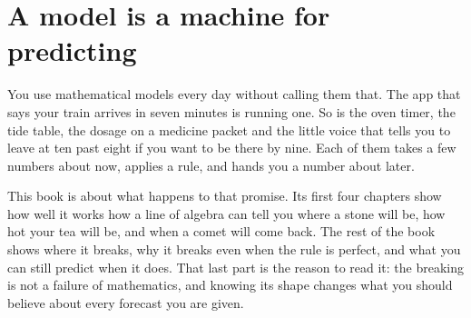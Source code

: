 
\chapter{A model is a machine for predicting}
\label{ch:models}

\noindent
You use mathematical models every day without calling them that. The app
that says your train arrives in seven minutes is running one. So is the
oven timer, the tide table, the dosage on a medicine packet and the little
voice that tells you to leave at ten past eight if you want to be there by
nine. Each of them takes a few numbers about now, applies a rule, and hands
you a number about later.

This book is about what happens to that promise. Its first four chapters
show how well it works \dash{} how a line of algebra can tell you where a
stone will be, how hot your tea will be, and when a comet will come back.
The rest of the book shows where it breaks, why it breaks even when the rule
is perfect, and what you can still predict when it does. That last part is
the reason to read it: the breaking is not a failure of mathematics, and
knowing its shape changes what you should believe about every forecast you
are given.

\begin{outcomes}
\end{outcomes}

